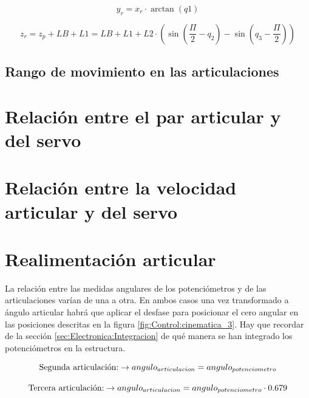     \begin{equation}
        y_r = x_r \cdot \arctan{(q1)}
    \end{equation}

    \begin{equation}
        z_r = z_p+LB+L1 = LB + L1 + L2\cdot \left( \sin\left(\frac{\varPi}{2}-q_2\right) - \sin\left(q_3-\frac{\varPi}{2}\right) \right)
    \end{equation}

\subsection{Rango de movimiento en las articulaciones}


\section{Relación entre el par articular y del servo}
\section{Relación entre la velocidad articular y del servo}
	
\section{Realimentación articular}

	La relación entre las medidas angulares de los potenciómetros y de las articulaciones varían de una a otra. En ambos casos una vez transformado a ángulo articular habrá que aplicar el desfase para posicionar el cero angular en las posiciones descritas en la figura \ref{fig:Control:cinematica_3}. Hay que recordar de la sección \ref{sec:Electronica:Integracion} de qué manera se han integrado los potenciómetros en la estructura.
	
	   \begin{equation}
		   \textnormal{Segunda articulación:} \to	angulo_{articulacion} = angulo_{potenciometro} 
	   \end{equation}
	   
	   \begin{equation}
		   \textnormal{Tercera articulación:} \to	   angulo_{articulacion} = angulo_{potenciometro} \cdot 0.679
	   \end{equation}